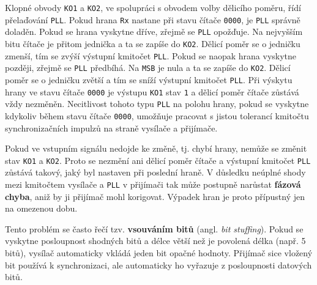        Klopné obvody \texttt{KO1} a \texttt{KO2}, ve spolupráci s obvodem volby dělicího poměru,
        řídí přelaďování \texttt{PLL}. Pokud hrana \texttt{Rx} nastane při stavu čítače
        \texttt{0000}, je \texttt{PLL} správně doladěn. Pokud se hrana vyskytne dříve, zřejmě se
        \texttt{PLL} opožďuje. Na nejvyšším bitu čítače je přitom jednička a ta se zapíše do
        \texttt{KO2}. Dělicí poměr se o jedničku zmenší, tím se zvýší výstupní kmitočet
        \texttt{PLL}. Pokud se naopak hrana vyskytne později, zřejmě se \texttt{PLL} předbíhá. Na
        \texttt{MSB} je nula a ta se zapíše do \texttt{KO2}. Dělicí poměr se o jedničku zvětší a tím
        se sníží výstupní kmitočet \texttt{PLL}. Při výskytu hrany ve stavu čítače \texttt{0000} je
        výstupu \texttt{KO1} stav \texttt{1} a dělicí poměr čítače zůstává vždy nezměněn.
        Necitlivost tohoto typu \texttt{PLL} na polohu hrany, pokud se vyskytne kdykoliv během stavu
        čítače \texttt{0000}, umožňuje pracovat s jistou tolerancí kmitočtu synchronizačních impulzů
        na straně vysílače a přijímače.
        
        Pokud ve vstupním signálu nedojde ke změně, tj. chybí hrany, nemůže se změnit stav
        \texttt{KO1} a \texttt{KO2}. Proto se nezmění ani dělicí poměr čítače a výstupní kmitočet
        \texttt{PLL} zůstává takový, jaký byl nastaven při poslední hraně. V důsledku neúplné shody
        mezi kmitočtem vysílače a \texttt{PLL} v přijímači tak může postupně narůstat \textbf{fázová
        chyba}, aniž by ji přijímač mohl korigovat. Výpadek hran je proto přípustný jen na omezenou
        dobu.
        
        Tento problém se často řečí tzv. \textbf{vsouváním bitů} (angl. \emph{bit stuffing}). Pokud 
        se vyskytne posloupnost shodných bitů a délce větší než je povolená délka (např. 5 bitů), 
        vysílač automaticky vkládá jeden bit opačné hodnoty. Přijímač sice vložený bit používá k 
        synchronizaci, ale automaticky ho vyřazuje z posloupnosti datových bitů.
        
